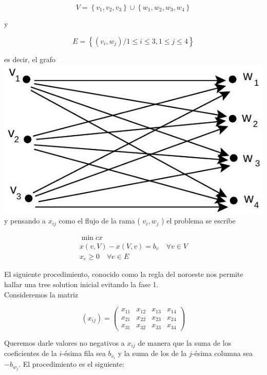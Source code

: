 \documentclass[10pt]{article}
\begin{document}
$$
V=\left\{v_{1}, v_{2}, v_{3}\right\} \cup\left\{w_{1}, w_{2}, w_{3}, w_{4}\right\}
$$

y

$$
E=\left\{\left(v_{i}, w_{j}\right) / 1 \leq i \leq 3,1 \leq j \leq 4\right\}
$$

es decir, el grafo\\
\includegraphics[max width=\textwidth, center]{2025_09_05_955b52bfc43174a24a9ag-28}\\
y pensando a $x_{i j}$ como el flujo de la rama ( $v_{i}, w_{j}$ ) el problema se escribe

$$
\begin{gathered}
\min c x \\
x(v, V)-x(V, v)=b_{v} \quad \forall v \in V \\
x_{e} \geq 0 \quad \forall e \in E
\end{gathered}
$$

El siguiente procedimiento, conocido como la regla del noroeste nos permite hallar una tree solution inicial evitando la fase 1.\\
Consideremos la matriz

$$
\left(x_{i j}\right)=\left(\begin{array}{llll}
x_{11} & x_{12} & x_{13} & x_{14} \\
x_{21} & x_{22} & x_{23} & x_{24} \\
x_{31} & x_{32} & x_{33} & x_{34}
\end{array}\right)
$$

Queremos darle valores no negativos a $x_{i j}$ de manera que la suma de los coeficientes de la $i$-ésima fila sea $b_{v_{i}}$ y la suma de los de la $j$-ésima columna sea $-b_{w_{j}}$. El procedimiento es el siguiente:
\end{document}
